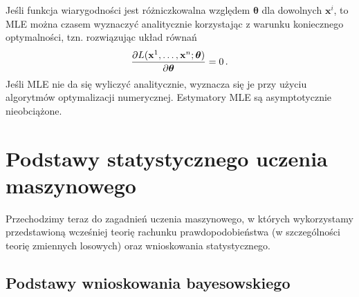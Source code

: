 \documentclass{myclass}
\numberwithin{equation}{subsection}
\begin{document}
Jeśli funkcja wiarygodności jest różniczkowalna względem \(\boldsymbol{\theta}\) dla dowolnych
\(\mathbf{x}^i\), to MLE można czasem wyznaczyć analitycznie korzystając z warunku koniecznego
optymalności, tzn. rozwiązując układ równań
\begin{equation}
    \pdv{L(\mathbf{x}^1,\ldots,\mathbf{x}^n; \boldsymbol{\theta})}{\boldsymbol{\theta}} = 0\,.
\end{equation}
Jeśli MLE nie da się wyliczyć analitycznie, wyznacza się je przy użyciu algorytmów optymalizacji
numerycznej. Estymatory MLE są asymptotycznie nieobciążone.


\section{Podstawy statystycznego uczenia maszynowego}

Przechodzimy teraz do zagadnień uczenia maszynowego, w których wykorzystamy przedstawioną wcześniej
teorię rachunku prawdopodobieństwa (w szczególności teorię zmiennych losowych) oraz wnioskowania
statystycznego.


\subsection{Podstawy wnioskowania bayesowskiego}
\end{document}
